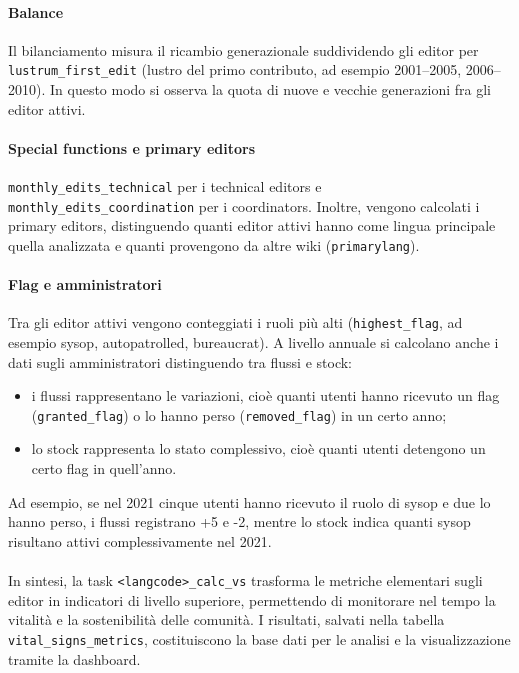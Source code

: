 \paragraph{Balance}  
Il bilanciamento misura il ricambio generazionale suddividendo gli editor per \texttt{lustrum\_first\allowbreak\_edit} (lustro del primo contributo, ad esempio 2001--2005, 2006--2010). 
In questo modo si osserva la quota di nuove e vecchie generazioni fra gli editor attivi.

\paragraph{Special functions e primary editors}  
\texttt{monthly\_edits\_technical} per i technical editors e \texttt{monthly\allowbreak\_edits\_coordination} per i coordinators. 
Inoltre, vengono calcolati i primary editors, distinguendo quanti editor attivi hanno come lingua principale quella analizzata e quanti provengono da altre wiki (\texttt{primarylang}).

\paragraph{Flag e amministratori}  
Tra gli editor attivi vengono conteggiati i ruoli più alti (\texttt{highest\_flag}, ad esempio sysop, autopatrolled, bureaucrat). 
A livello annuale si calcolano anche i dati sugli amministratori distinguendo tra flussi e stock:  
\begin{itemize}
  \item i flussi rappresentano le variazioni, cioè quanti utenti hanno ricevuto un flag (\texttt{granted\_flag}) o lo hanno perso (\texttt{removed\_flag}) in un certo anno;  
  \item lo stock rappresenta lo stato complessivo, cioè quanti utenti detengono un certo flag in quell’anno.  
\end{itemize}
Ad esempio, se nel 2021 cinque utenti hanno ricevuto il ruolo di sysop e due lo hanno perso, i flussi registrano +5 e -2, mentre lo stock indica quanti sysop risultano attivi complessivamente nel 2021.

\paragraph{}  
In sintesi, la task \texttt{<langcode>\_calc\_vs} trasforma le metriche elementari sugli editor in indicatori di livello superiore, permettendo di monitorare nel tempo la vitalità e la sostenibilità delle comunità. I risultati, salvati nella tabella \texttt{vital\_signs\_metrics}, costituiscono la base dati per le analisi e la visualizzazione tramite la dashboard.

